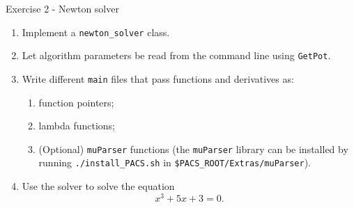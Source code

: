 \documentclass[10pt]{beamer}
\begin{document}
\begin{frame}{Exercise 2 - Newton solver}
\begin{enumerate}
\item Implement a \texttt{newton\_solver} class.
\item Let algorithm parameters be read from the command line using \texttt{GetPot}.
\item Write different \texttt{main} files that pass functions and derivatives as:
\begin{enumerate}
\item function pointers;
\item lambda functions;
\item (Optional) \texttt{muParser} functions (the \texttt{muParser} library can be installed by running \texttt{./install\_PACS.sh} in \texttt{\${PACS\_ROOT}/Extras/muParser}).
\end{enumerate}
\item Use the solver to solve the equation
\begin{equation*}
x^3 + 5 x + 3 = 0.
\end{equation*}
\end{enumerate}
\end{frame}
\end{document}
